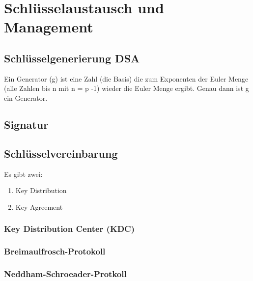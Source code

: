 \documentclass[a4paper]{article}
\title{\docTitle}
\author{Moritz}
\date{\today}
\begin{document}
\maketitle
\tableofcontents


\section{Schlüsselaustausch und Management}

\subsection{Schlüsselgenerierung DSA}

Ein Generator (g) ist eine Zahl (die Basis) die zum Exponenten der Euler Menge (alle Zahlen bis n mit n = p -1) wieder die Euler Menge ergibt. Genau dann ist g ein Generator.

\subsection{Signatur}


\subsection{Schlüsselvereinbarung}

Es gibt zwei:

\begin{enumerate}
    \item Key Distribution
    \item Key Agreement
\end{enumerate}

\subsubsection{Key Distribution Center (KDC)}

\subsubsection{Breimaulfrosch-Protokoll}

\subsubsection{Neddham-Schroeader-Protkoll}
\end{document}
